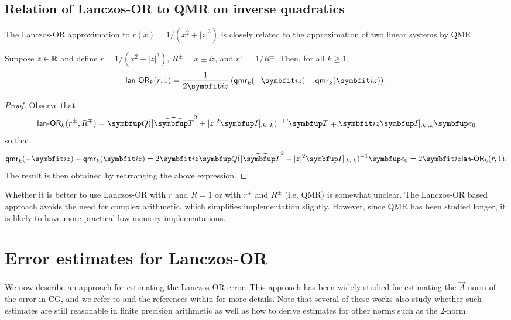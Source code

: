 \subsection{Relation of Lanczos-OR to QMR on inverse quadratics}

The Lanczos-OR approximation to \( r(x) = 1/(x^2+|z|^2) \) is closely related to the approximation of two linear systems by QMR. 
\begin{lemma}
Suppose $z\in\mathbb{R}$ and define $r= 1/(x^2+|z|^2)$, $R^\pm = x\pm \ii z$, and $r^\pm = 1/R^\pm$.
Then, for all \( k\geq 1 \),
\begin{equation*}
    \lanopt_k(r,1)
    = \frac{1}{2\ii z} \left( \mathsf{qmr}_k(-\ii z) - \mathsf{qmr}_k(\ii z) \right).
\end{equation*}
\end{lemma}

\begin{proof}
Observe that
\begin{equation*}
    \lanopt_k(r^\pm,R^\mp) = \vec{Q}([\widehat{\vec{T}}^2+|z|^2\vec{I}]_{:k,:k})^{-1} [\vec{T} \mp \ii z \vec{I}]_{:k,:k} \vec{e}_0
\end{equation*}
so that 
\begin{equation*}
    \mathsf{qmr}_k(-\ii z) - \mathsf{qmr}_k(\ii z) 
    = 2 \ii z  \vec{Q}([\widehat{\vec{T}}^2+|z|^2\vec{I}]_{:k,:k})^{-1} \vec{e}_0
    = 2 \ii z \lanopt_k(r,1).
\end{equation*}
The result is then obtained by rearranging the above expression.
\end{proof}

Whether it is better to use Lanczos-OR with $r$ and $R=1$ or with $r^\pm$ and $R^\pm$ (i.e. QMR) is somewhat unclear.
The Lanczos-OR based approach avoids the need for complex arithmetic, which simplifies implementation slightly. 
However, since QMR has been studied longer, it is likely to have more practical low-memory implementations.


\section{Error estimates for Lanczos-OR}
\label{sec:error_OR}

We now describe an approach for estimating the Lanczos-OR error.
This approach has been widely studied for estimating the \( \vec{A} \)-norm of the error in CG, and we refer to \cite{strakos_tichy_02,meurant_tichy_18,estrin_orban_saunders_19,meurant_papez_tichy_21} and the references within for more details.
Note that several of these works also study whether such estimates are still reasonable in finite precision arithmetic as well as how to derive estimates for other norms such as the 2-norm.


